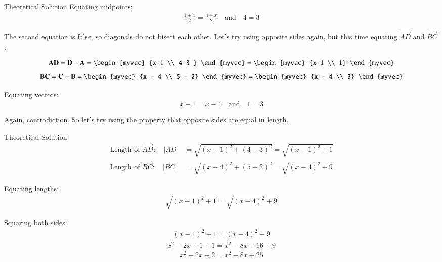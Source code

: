 \documentclass{beamer}
\begin{document}
\begin{frame}{Theoretical Solution}
Equating midpoints:
\begin{align}
\frac{1 + x}{2} = \frac{4 + x}{2} \quad \text{and} \quad 4 = 3
\end{align}

The second equation is false, so diagonals do not bisect each other. Let's try using opposite sides again, but this time equating $ \vec{AD} $ and $ \vec{BC} $:

\begin{align}
\vec{AD} = \vec{D} -\vec{A} = \begin{myvec}
    {x-1 \\ 4-3 } \end{myvec} =\begin{myvec}
        {x-1 \\ 1}
    \end{myvec}
 \end{align}   
 \begin{align}
\vec{BC} =\vec{C} -\vec{B} = \begin{myvec}
    {x - 4 \\ 5 - 2} \end{myvec} =\begin{myvec}
         {x - 4 \\ 3}
     \end{myvec}
\end{align}

Equating vectors:
\begin{align}
x - 1 = x - 4 \quad \text{and} \quad 1 = 3
\end{align}

Again, contradiction. So let's try using the property that opposite sides are equal in length.
\end{frame}

\begin{frame}{Theoretical Solution}
\begin{align}
\text{Length of } \vec{AD}: \quad |AD| &= \sqrt{(x - 1)^2 + (4 - 3)^2} = \sqrt{(x - 1)^2 + 1} \\
\text{Length of } \vec{BC}: \quad |BC| &= \sqrt{(x - 4)^2 + (5 - 2)^2} = \sqrt{(x - 4)^2 + 9}
\end{align}

Equating lengths:
\begin{align}
\sqrt{(x - 1)^2 + 1} = \sqrt{(x - 4)^2 + 9}
\end{align}

Squaring both sides:
\begin{align}
(x - 1)^2 + 1 = (x - 4)^2 + 9
\end{align}
\begin{align}
x^2 - 2x + 1 + 1 = x^2 - 8x + 16 + 9
\end{align}
\begin{align}
x^2 - 2x + 2 = x^2 - 8x + 25
\end{align}

\end{frame}
\end{document}
